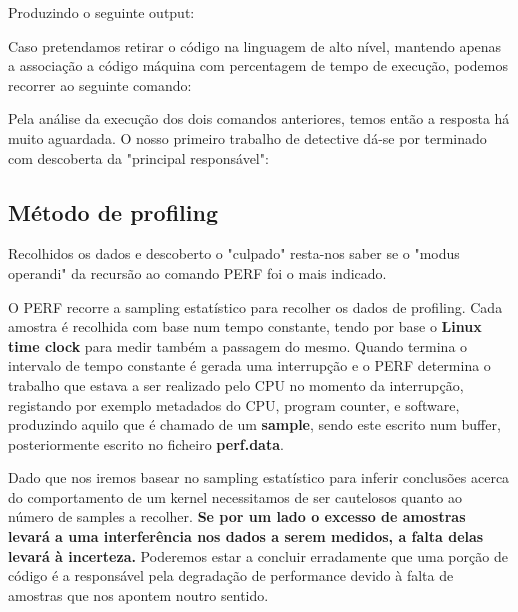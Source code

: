 \documentclass[conference,compsoc]{IEEEtran}
\begin{document}
\begin{itemize}

Produzindo o seguinte output: 

Caso pretendamos retirar o código na linguagem de alto nível, mantendo apenas a associação a código máquina com percentagem de tempo de execução, podemos recorrer ao seguinte comando:

Pela análise da execução dos dois comandos anteriores, temos então a resposta há muito aguardada. O nosso primeiro trabalho de detective dá-se por terminado com descoberta da  "principal responsável":


\subsection{Método de profiling}

Recolhidos os dados e descoberto o "culpado" resta-nos saber se o "modus operandi" da recursão ao comando PERF foi o mais indicado.\par
O PERF recorre a sampling estatístico para recolher os dados de profiling. Cada amostra é recolhida com base num tempo constante, tendo por base o \textbf{Linux time clock} para medir também a passagem do mesmo. Quando termina o intervalo de tempo constante é gerada uma interrupção e o PERF determina o trabalho que estava a ser realizado pelo CPU no momento da interrupção, registando por exemplo metadados do CPU, program counter, e software, produzindo aquilo que é chamado de um \textbf{sample}, sendo este escrito num buffer, posteriormente escrito no ficheiro \textbf{perf.data}. \par 

Dado que nos iremos basear no sampling estatístico para inferir conclusões acerca do comportamento de um kernel necessitamos de ser cautelosos quanto ao número de samples a recolher. \textbf{Se por um lado o excesso de amostras levará a uma interferência nos dados a serem medidos, a falta delas levará à incerteza.} Poderemos estar a concluir erradamente que uma porção de código é a responsável pela degradação de performance devido à falta de amostras que nos apontem noutro sentido. \par 


\end{itemize}
\end{document}
